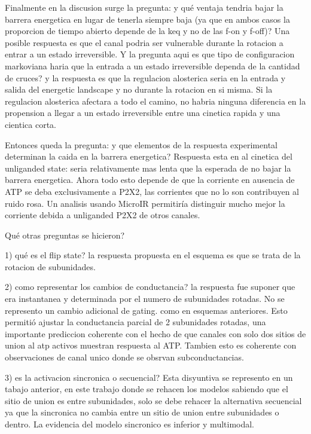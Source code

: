 \documentclass[a4paper,12pt]{article}
\begin{document}
		Finalmente en la discusion surge la pregunta: y qué ventaja tendria bajar la barrera energetica en lugar de tenerla siempre baja (ya que en ambos casos la proporcion de tiempo abierto depende de la keq y no de las f-on y f-off)? 
		Una posible respuesta es que el canal podria ser vulnerable durante la rotacion a entrar a un estado irreversible. Y la pregunta aqui es que tipo de configuracion markoviana haria que la entrada a un estado irreversible dependa de la cantidad de cruces? y la respuesta es que la regulacion alosterica seria en la entrada y salida del energetic landscape y no durante la rotacion en si misma. Si la regulacion alosterica afectara a todo el camino, no habria ninguna diferencia en la propension a llegar a un estado irreversible entre una cinetica rapida y una cientica corta. 
		
		Entonces queda la pregunta: y que elementos de la respuesta experimental determinan la caida en la barrera energetica? Respuesta esta en al cinetica del unliganded state: seria relativamente mas lenta que la esperada de no bajar la barrera energetica. 
		Ahora todo esto depende de que la corriente en ausencia de ATP se deba exclusivamente a P2X2, las corrientes que no lo son contribuyen al ruido rosa. Un analisis usando MicroIR permitiría distinguir mucho mejor la corriente debida a unliganded P2X2 de otros canales. 
		
		Qué otras preguntas se hicieron?
		
		1) qué es el flip state? la respuesta propuesta en el esquema es que se trata de la rotacion de subunidades.
		
		2) como representar los cambios de conductancia? la respuesta fue suponer que era instantanea y determinada por el numero de subunidades rotadas. No se represento un cambio adicional de gating. como en esquemas anteriores. Esto permitió ajustar la conductancia parcial de 2 subunidades rotadas, una importante prediccion coherente con el hecho de que canales con solo dos sitios de union al atp activos muestran respuesta al ATP. Tambien esto es coherente con observaciones de canal unico donde se obsrvan subconductancias. 
		
		3) es la activacion sincronica o secuencial? Esta disyuntiva se represento en un tabajo anterior, en este trabajo donde se rehacen los modelos sabiendo que el sitio de union es entre subunidades, solo se debe rehacer la alternativa secuencial ya que la sincronica no cambia entre un sitio de union entre subunidades o dentro. La evidencia del modelo sincronico es inferior y multimodal.
	
\end{document}
